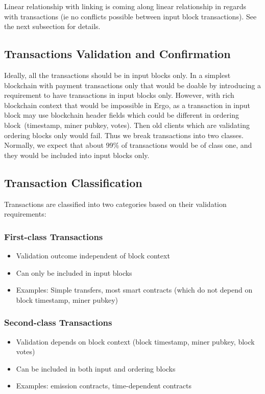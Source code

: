 \documentclass{llncs}
\begin{document}
Linear relationship with linking is coming along linear relationship in regards with transactions (ie no conflicts
possible between input block transactions). See the next subsection for details.

\subsection{Transactions Validation and Confirmation}
\label{subsec:transactions-validation}

Ideally, all the transactions should be in input blocks only. In a simplest blockchain with payment transactions only that would
be doable by introducing a requirement to have transactions in input blocks only. However, with rich blockchain context that would be
impossible in Ergo, as a transaction in input block may use blockchain header fields which could be different in ordering block~(timestamp, miner pubkey, votes). Then old clients which are validating ordering blocks only would fail. Thus we break transactions into two classes. Normally, we expect that about 99\% of transactions would be of class one, and they would be included into input blocks only.


\subsection{Transaction Classification}
\label{subsec:transaction-classification}

Transactions are classified into two categories based on their validation requirements:


\subsubsection{First-class Transactions}
\label{subsubsec:first-class}
\begin{itemize}
\item Validation outcome independent of block context
\item Can only be included in input blocks
\item Examples: Simple transfers, most smart contracts (which do not depend on block timestamp, miner pubkey)
\end{itemize}

\subsubsection{Second-class Transactions}
\label{subsubsec:second-class}
\begin{itemize}
\item Validation depends on block context (block timestamp, miner pubkey, block votes)
\item Can be included in both input and ordering blocks
\item Examples: emission contracts, time-dependent contracts
\end{itemize}
\end{document}
